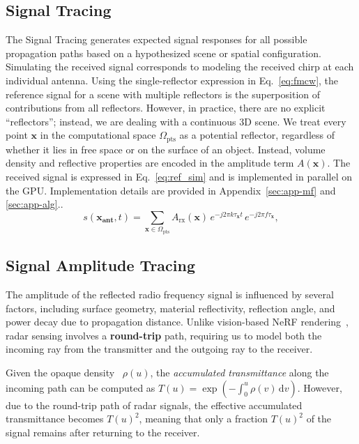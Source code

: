 \subsection{Signal Tracing}
\label{sec:signaltracing}
The Signal Tracing generates expected signal responses for all possible propagation paths based on a hypothesized scene or spatial configuration.
Simulating the received signal corresponds to modeling the received chirp at each individual antenna.
Using the single-reflector expression in Eq.~\ref{eq:fmcw}, the reference signal for a scene with multiple reflectors is the superposition of contributions from all reflectors.
However, in practice, there are no explicit ``reflectors''; instead, we are dealing with a continuous 3D scene.
We treat every point \( \mathbf{x} \) in the computational space \( \Omega_\text{pts} \) as a potential reflector, regardless of whether it lies in free space or on the surface of an object.
Instead, volume density and reflective properties are encoded in the amplitude term \( A(\mathbf{x}) \).
The received signal is expressed in Eq.~\ref{eq:ref_sim} and is implemented in parallel on the GPU.
Implementation details are provided in Appendix~\ref{sec:app-mf} and \ref{sec:app-alg}..
\begin{equation}
\label{eq:ref_sim}
s(\mathbf{x_{ant}}, t) = \sum_{\mathbf{x} \in \Omega_\text{pts}} A_{\text{rx}}(\mathbf{x})\, e^{-j 2\pi k \tau_{\mathbf{x}} t} \, e^{-j 2\pi f \tau_{\mathbf{x}}},
\end{equation}

\subsection{Signal Amplitude Tracing}
The amplitude of the reflected radio frequency signal is influenced by several factors, including surface geometry, material reflectivity, reflection angle, and power decay due to propagation distance.
Unlike vision-based NeRF rendering~\cite{mildenhall2021nerf}, radar sensing involves a \textbf{round-trip} path, requiring us to model both the incoming ray from the transmitter and the outgoing ray to the receiver.

Given the opaque density~\cite{wang2021neus} \( \rho(u) \), the \textit{accumulated transmittance} along the incoming path can be computed as
\(
T(u) = \exp\left(-\int_0^u \rho(v)\, \mathrm{d}v\right).
\)
However, due to the round-trip path of radar signals, the effective accumulated transmittance becomes \( T(u)^2 \), meaning that only a fraction \( T(u)^2 \) of the signal remains after returning to the receiver.

